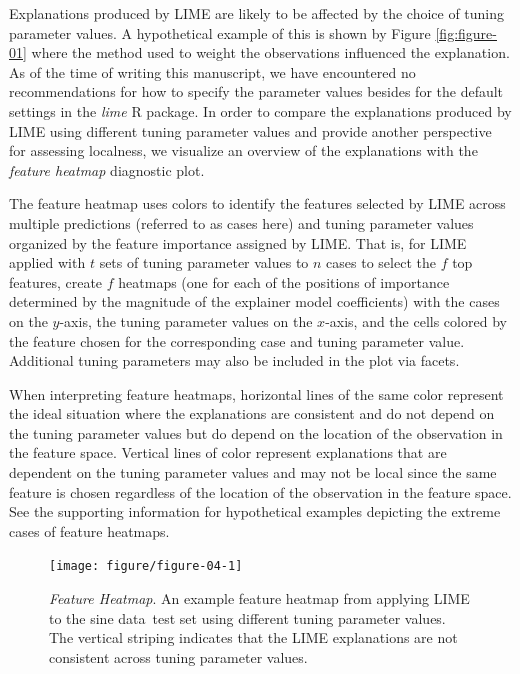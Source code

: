 \documentclass[AMS,STIX2COL]{WileyNJD-v2}\usepackage[]{graphicx}\usepackage[]{color}
\newenvironment{knitrout}{}{} %
\newcommand{\data}{sine data}
\begin{document}
Explanations produced by LIME are likely to be affected by the choice of tuning parameter values. A hypothetical example of this is shown by Figure \ref{fig:figure-01} where the method used to weight the observations influenced the explanation. As of the time of writing this manuscript, we have encountered no recommendations for how to specify the parameter values besides for the default settings in the \emph{lime} R package. In order to compare the explanations produced by LIME using different tuning parameter values and provide another perspective for assessing localness, we visualize an overview of the explanations with the \emph{feature heatmap} diagnostic plot. 

The feature heatmap uses colors to identify the features selected by LIME across multiple predictions (referred to as cases here) and tuning parameter values organized by the feature importance assigned by LIME. That is, for LIME applied with $t$ sets of tuning parameter values to $n$ cases to select the $f$ top features, create $f$ heatmaps (one for each of the positions of importance determined by the magnitude of the explainer model coefficients) with the cases on the $y$-axis, the tuning parameter values on the $x$-axis, and the cells colored by the feature chosen for the corresponding case and tuning parameter value. Additional tuning parameters may also be included in the plot via facets. 

When interpreting feature heatmaps, horizontal lines of the same color represent the ideal situation where the explanations are consistent and do not depend on the tuning parameter values but do depend on the location of the observation in the feature space. Vertical lines of color represent explanations that are dependent on the tuning parameter values and may not be local since the same feature is chosen regardless of the location of the observation in the feature space. See the supporting information for hypothetical examples depicting the extreme cases of feature heatmaps.

\begin{figure}[!tp]
\begin{knitrout}
\color{fgcolor}

{\centering \texttt{[image: figure/figure-04-1]} 

}


\end{knitrout}
\caption{\emph{Feature Heatmap}. An example feature heatmap  from applying LIME to the \data \ test set using different tuning parameter values. The vertical striping indicates that the LIME explanations are not consistent across tuning parameter values.}
\label{fig:figure-04}
\end{figure}
\end{document}
